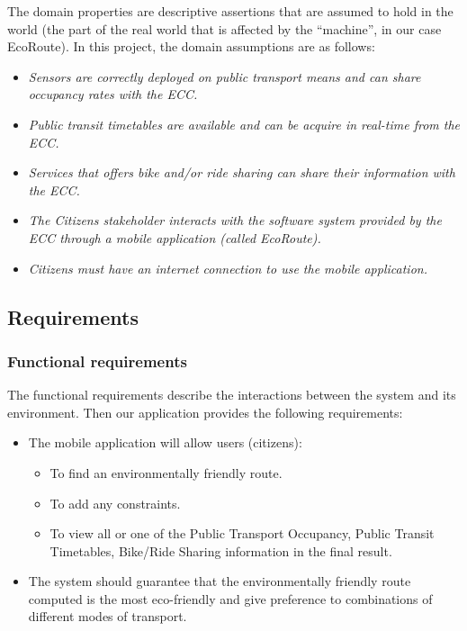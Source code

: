\documentclass[a4paper]{article}
\newcommand{\dquotes}[1]{``#1''}
\begin{document}
    The domain properties are descriptive assertions that are assumed to hold in the world (the part of the real world that is affected by the \dquotes{machine}, in our case EcoRoute). In this project, the domain assumptions are as follows:
    \begin{itemize}
        \item \emph{Sensors are correctly deployed on public transport means and can share occupancy rates with the ECC.}
        
        \item \emph{Public transit timetables are available and can be acquire in real-time from the ECC.}

        \item \emph{Services that offers bike and/or ride sharing can share their information with the ECC.}
        
        \item \emph{The Citizens stakeholder interacts with the software system provided by the ECC through a mobile application (called EcoRoute).}
        
        \item \emph{Citizens must have an internet connection to use the mobile application.}
    \end{itemize}

    \newpage

    \subsection{Requirements}
    
    \subsubsection{Functional requirements}

    The functional requirements describe the interactions between the system and its environment. Then our application provides the following requirements:
    \begin{itemize}
        \item The mobile application will allow users (citizens):
        \begin{itemize}
            \item To find an environmentally friendly route.

            \item To add any constraints.
            
            \item To view all or one of the Public Transport Occupancy, Public Transit Timetables, Bike/Ride Sharing information in the final result.
        \end{itemize}

        \item The system should guarantee that the environmentally friendly route computed is the most eco-friendly and give preference to combinations of different modes of transport.
    \end{itemize}
\end{document}

